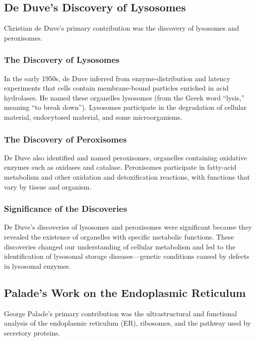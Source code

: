 \subsection{De Duve's Discovery of Lysosomes}

Christian de Duve's primary contribution was the discovery of lysosomes and peroxisomes.

\subsubsection{The Discovery of Lysosomes}

In the early 1950s, de Duve inferred from enzyme-distribution and latency experiments that cells contain membrane-bound particles enriched in acid hydrolases. He named these organelles lysosomes (from the Greek word ``lysis,'' meaning ``to break down''). Lysosomes participate in the degradation of cellular material, endocytosed material, and some microorganisms.

\subsubsection{The Discovery of Peroxisomes}

De Duve also identified and named peroxisomes, organelles containing oxidative enzymes such as oxidases and catalase. Peroxisomes participate in fatty-acid metabolism and other oxidation and detoxification reactions, with functions that vary by tissue and organism.

\subsubsection{Significance of the Discoveries}

De Duve's discoveries of lysosomes and peroxisomes were significant because they revealed the existence of organelles with specific metabolic functions. These discoveries changed our understanding of cellular metabolism and led to the identification of lysosomal storage diseases---genetic conditions caused by defects in lysosomal enzymes.

\subsection{Palade's Work on the Endoplasmic Reticulum}

George Palade's primary contribution was the ultrastructural and functional analysis of the endoplasmic reticulum (ER), ribosomes, and the pathway used by secretory proteins.

